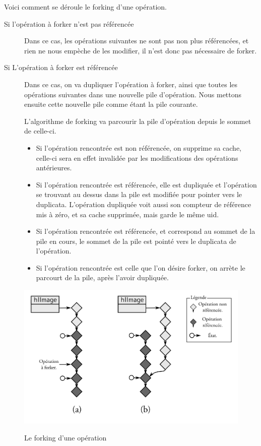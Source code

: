 			Voici comment se déroule le forking d'une opération.
			\begin{description}
				\item[Si l'opération à forker n'est pas référencée] Dans ce cas, les opérations suivantes ne sont pas non plus référencées,
				et rien ne nous empèche de les modifier, il n'est donc pas nécessaire de forker.
				\item[Si L'opération à forker est référencée] Dans ce cas, on va dupliquer l'opération à forker, ainsi que toutes les 
				opérations suivantes dans une nouvelle pile d'opération. Nous mettons ensuite cette nouvelle pile comme étant la pile
				courante.
				
				L'algorithme de forking va parcourir la pile d'opération 
				depuis le sommet de celle-ci. 
				\begin{itemize}
					\item Si l'opération rencontrée est non référencée, on supprime sa cache, celle-ci sera en effet
				invalidée par les modifications des opérations antérieures. 
					\item Si l'opération rencontrée est référencée, elle est dupliquée et l'opération se trouvant 
					au dessus dans la pile est modifiée pour pointer vers le duplicata. L'opération dupliquée voit 
					aussi son compteur de référence mis à zéro, et sa cache supprimée, mais garde le même uid.
					\item Si l'opération rencontrée est référencée, et correspond au sommet de la pile en cours, le
					sommet de la pile est pointé vers le duplicata de l'opération.
					\item Si l'opération rencontrée est celle que l'on désire forker, on arrète le parcourt de la pile,
					après l'avoir dupliquée.
				\end{itemize}
			\end{description}

		\begin{figure}[ht]
			\centering
			\includegraphics[width=\textwidth]{images/forking} 
			\label{fig:forking}
			\caption{Le forking d'une opération}
		\end{figure}

